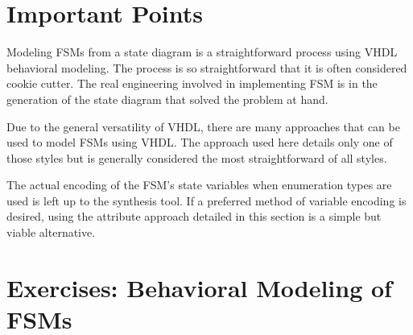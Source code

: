 \section{Important Points}

\begin{my_list}
\item Modeling FSMs from a state diagram is a straightforward process using VHDL behavioral modeling. The process is so straightforward that it is often considered cookie cutter. The real engineering involved in implementing FSM is in the generation of the state diagram that solved the problem at hand.

\item Due to the general versatility of VHDL, there are many approaches that can be used to model FSMs using VHDL. The approach used here details only one of those styles but is generally considered the most straightforward of all styles. 

\item The actual encoding of the FSM's state variables when enumeration types are used is left up to the synthesis tool. If a preferred method of variable encoding is desired, using the attribute approach detailed in this section is a simple but viable alternative. 
\end{my_list}

\section{Exercises: Behavioral Modeling of FSMs}

